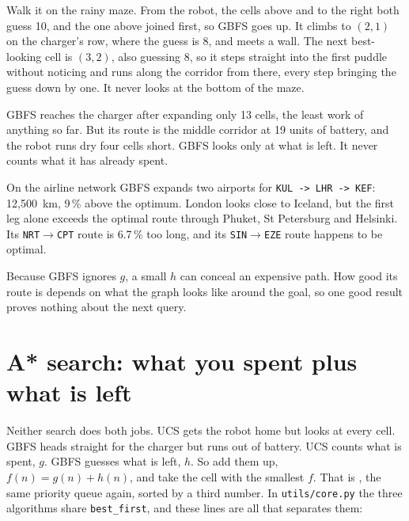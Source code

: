 Walk it on the rainy maze. From the robot, the cells above and to the right both guess 10, and the one above joined first, so GBFS goes up. It climbs to $(2,1)$ on the charger's row, where the guess is 8, and meets a wall. The next best-looking cell is $(3,2)$, also guessing 8, so it steps straight into the first puddle without noticing and runs along the corridor from there, every step bringing the guess down by one. It never looks at the bottom of the maze.

GBFS reaches the charger after expanding only 13 cells, the least work of anything so far. But its route is the middle corridor at 19 units of battery, and the robot runs dry four cells short. GBFS looks only at what is left. It never counts what it has already spent.

\begin{workedexample}
On the airline network GBFS expands two airports for \texttt{KUL -> LHR -> KEF}: 12,500~km, 9\,\% above the optimum. London looks close to Iceland, but the first leg alone exceeds the optimal route through Phuket, St Petersburg and Helsinki. Its \texttt{NRT}$\to$\texttt{CPT} route is 6.7\,\% too long, and its \texttt{SIN}$\to$\texttt{EZE} route happens to be optimal.
\end{workedexample}

\begin{pitfall}
Because GBFS ignores $g$, a small $h$ can conceal an expensive path. How good its route is depends on what the graph looks like around the goal, so one good result proves nothing about the next query.
\end{pitfall}

\section{A* search: what you spent plus what is left}

Neither search does both jobs. UCS gets the robot home but looks at every cell. GBFS heads straight for the charger but runs out of battery. UCS counts what is spent, $g$. GBFS guesses what is left, $h$. So add them up, $f(n)=g(n)+h(n)$, and take the cell with the smallest $f$. That is , the same priority queue again, sorted by a third number. In \texttt{utils/core.py} the three algorithms share \texttt{best\_first}, and these lines are all that separates them:



